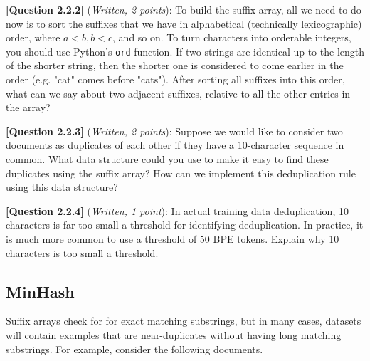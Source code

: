 \documentclass[leqno,12pt]{article}
\begin{document}
\begin{tcolorbox}[fit,height=1cm, width=0.3\linewidth, blank, borderline={1pt}{-2pt}]
\end{tcolorbox}

\noindent \textbf{[Question 2.2.2]} (\emph{Written, 2 points}): To build the suffix array, all we need to do now is to sort the suffixes that we have in alphabetical (technically lexicographic) order, where $a < b, b < c$, and so on.
To turn characters into orderable integers, you should use Python's \texttt{ord} function.
If two strings are identical up to the length of the shorter string, then the shorter one is considered to come earlier in the order (e.g. "cat" comes before "cats"). After sorting all suffixes into this order, what can we say about two adjacent suffixes, relative to all the other entries in the array? 

\begin{tcolorbox}[fit,height=2cm, width=\linewidth, blank, borderline={1pt}{-2pt}]

\end{tcolorbox}

\noindent \textbf{[Question 2.2.3]} (\emph{Written, 2 points}): 
Suppose we would like to consider two documents as duplicates of each other if they have a 10-character sequence in common.
What data structure could you use to make it easy to find these duplicates using the suffix array?
How can we implement this deduplication rule using this data structure? 

\begin{tcolorbox}[fit,height=2cm, width=\linewidth, blank, borderline={1pt}{-2pt}]

\end{tcolorbox}

\noindent \textbf{[Question 2.2.4]} (\emph{Written, 1 point}):  In actual training data deduplication, 10 characters is far too small a threshold for identifying deduplication.
In practice, it is much more common to use a threshold of 50 BPE tokens.
Explain why 10 characters is too small a threshold.

\begin{tcolorbox}[fit,height=2cm, width=\linewidth, blank, borderline={1pt}{-2pt}]

\end{tcolorbox}


\subsection{MinHash}
\noindent Suffix arrays check for for exact matching substrings, but in many cases, datasets will contain examples that are near-duplicates without having long matching substrings.
For example, consider the following documents.
\end{document}
